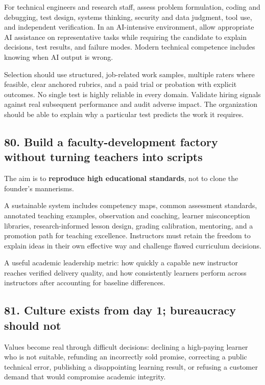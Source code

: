For technical engineers and research staff, assess problem formulation, coding and debugging, test design, systems thinking, security and data judgment, tool use, and independent verification. In an AI-intensive environment, allow appropriate AI assistance on representative tasks while requiring the candidate to explain decisions, test results, and failure modes. Modern technical competence includes knowing when AI output is wrong.

Selection should use structured, job-related work samples, multiple raters where feasible, clear anchored rubrics, and a paid trial or probation with explicit outcomes. No single test is highly reliable in every domain. Validate hiring signals against real subsequent performance and audit adverse impact. The organization should be able to explain why a particular test predicts the work it requires.

\subsection{80. Build a faculty-development factory without turning teachers into scripts}

The aim is to \textbf{reproduce high educational standards}, not to clone the founder's mannerisms.

A sustainable system includes competency maps, common assessment standards, annotated teaching examples, observation and coaching, learner misconception libraries, research-informed lesson design, grading calibration, mentoring, and a promotion path for teaching excellence. Instructors must retain the freedom to explain ideas in their own effective way and challenge flawed curriculum decisions.

A useful academic leadership metric: how quickly a capable new instructor reaches verified delivery quality, and how consistently learners perform across instructors after accounting for baseline differences.

\subsection{81. Culture exists from day 1; bureaucracy should not}

Values become real through difficult decisions: declining a high-paying learner who is not suitable, refunding an incorrectly sold promise, correcting a public technical error, publishing a disappointing learning result, or refusing a customer demand that would compromise academic integrity.

